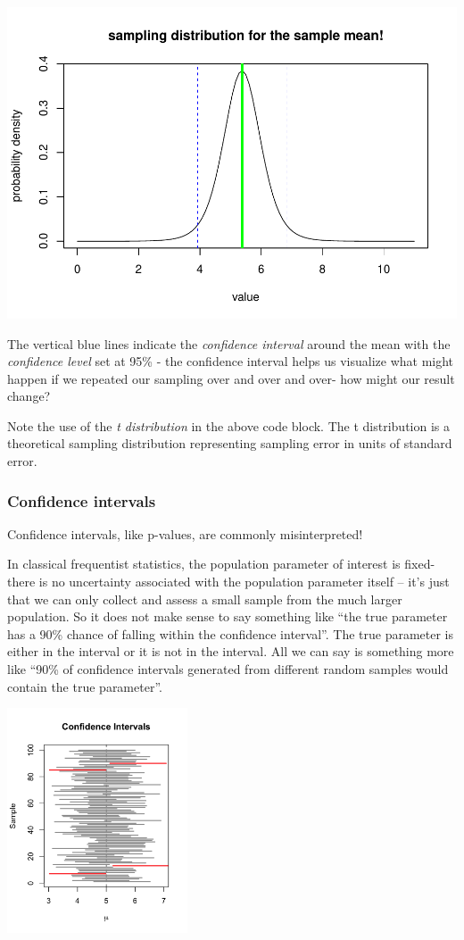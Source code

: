 \documentclass[
]{article}
\begin{document}
\includegraphics{LECTURE2_files/figure-latex/unnamed-chunk-12-1.pdf}

The vertical blue lines indicate the \emph{confidence interval} around
the mean with the \emph{confidence level} set at 95\% - the confidence
interval helps us visualize what might happen if we repeated our
sampling over and over and over- how might our result change?

Note the use of the \emph{t distribution} in the above code block. The t
distribution is a theoretical sampling distribution representing
sampling error in units of standard error.

\hypertarget{confidence-intervals}{%
\subsubsection{Confidence intervals}\label{confidence-intervals}}

Confidence intervals, like p-values, are commonly misinterpreted!

In classical frequentist statistics, the population parameter of
interest is fixed- there is no uncertainty associated with the
population parameter itself -- it's just that we can only collect and
assess a small sample from the much larger population. So it does not
make sense to say something like ``the true parameter has a 90\% chance
of falling within the confidence interval''. The true parameter is
either in the interval or it is not in the interval. All we can say is
something more like ``90\% of confidence intervals generated from
different random samples would contain the true parameter''.

\includegraphics[width=0.4\textwidth,height=\textheight]{confint1.png}
\end{document}

